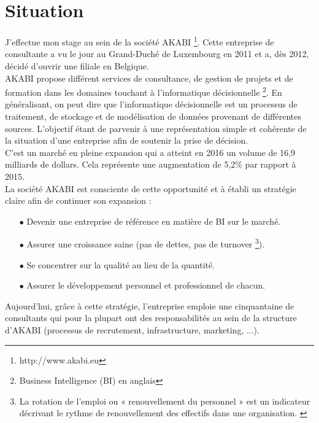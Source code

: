 \documentclass[a4paper, 12pt, french]{article}
\begin{document}
\tableofcontents
\newpage

\section{Situation}

J’effectue mon stage au sein de la société AKABI \footnote{http://www.akabi.eu}. Cette entreprise de consultante a vu le jour au Grand-Duché de Luxembourg en 2011 et a, dès 2012, décidé d’ouvrir une filiale en Belgique. \\

AKABI propose différent services de consultance, de gestion de projets et de formation dans les domaines touchant à l’informatique décisionnelle \footnote{Business Intelligence (BI) en anglais}. En généralisant, on peut dire que l’informatique décisionnelle est un processus de traitement, de stockage et de modélisation de données provenant de différentes sources. L’objectif étant de parvenir à une représentation simple et cohérente de la situation d’une entreprise afin de soutenir la prise de décision. \\

C’est un marché en pleine expansion qui a atteint en 2016 un volume de 16,9 milliards de dollars. Cela représente une augmentation de 5,2\% par rapport à 2015. \citep{ZDNet2016Marche2016}  \\ 

La société AKABI est consciente de cette opportunité et à établi un stratégie claire afin de continuer son expansion :

\vspace{0.25cm}
\begin{itemize}
\item[$\bullet$] Devenir une entreprise de référence en matière de BI sur le marché.
\item[$\bullet$] Assurer une croissance saine (pas de dettes, pas de turnover \footnote{La rotation de l'emploi ou « renouvellement du personnel » est un indicateur décrivant le rythme de renouvellement des effectifs dans une organisation. \citep{WikipediaTurnover}}).
\item[$\bullet$] Se concentrer sur la qualité au lieu de la quantité.
\item[$\bullet$] Assurer le développement personnel et professionnel de chacun.
\end{itemize}
\vspace{0.5cm}

Aujourd’hui, grâce à cette stratégie, l’entreprise emploie une cinquantaine de consultants qui pour la plupart ont des responsabilités au sein de la structure d’AKABI (processus de recrutement, infrastructure, marketing, ...). 
\end{document}
